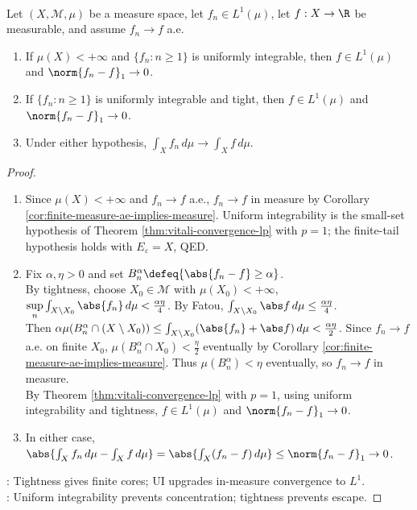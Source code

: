 \begin{theorem} \label{thm:vitali-convergence-l1-ui-tight-ae} \\
Let $(X,\mathcal{M},\mu)$ be a measure space, let $f_n\in L^1(\mu)$, let $f:X\to\R$ be measurable, and assume $f_n\to f$ a.e.
\begin{enumerate}[label=(\roman*)]
\setlength{\itemsep}{0pt}
\item If $\mu(X)<+\infty$ and $\{f_n:n\geq1\}$ is uniformly integrable, then $f\in L^1(\mu)$ and $\norm{f_n-f}_1\to0$.
\item If $\{f_n:n\geq1\}$ is uniformly integrable and tight, then $f\in L^1(\mu)$ and $\norm{f_n-f}_1\to0$.
\item Under either hypothesis, $\int_Xf_n\,d\mu\to\int_Xf\,d\mu$.
\end{enumerate}
\begin{proof}
\begin{enumerate}[label=(\roman*)]
\setlength{\itemsep}{0pt}
\item Since $\mu(X)<+\infty$ and $f_n\to f$ a.e., $f_n\to f$ in measure by Corollary \ref{cor:finite-measure-ae-implies-measure}. Uniform integrability is the small-set hypothesis of Theorem \ref{thm:vitali-convergence-lp} with $p=1$; the finite-tail hypothesis holds with $E_\varepsilon=X$, QED.
\item Fix $\alpha,\eta>0$ and set $B_n^\alpha\defeq\{\abs{f_n-f}\geq\alpha\}$.\\
By tightness, choose $X_0\in\mathcal M$ with $\mu(X_0)<+\infty$, $\sup\limits_n\int_{X\setminus X_0}\abs{f_n}\,d\mu<\frac{\alpha\eta}{4}$. By Fatou, $\int_{X\setminus X_0}\abs f\,d\mu\leq\frac{\alpha\eta}{4}$.\\
Then $\alpha\mu(B_n^\alpha\cap(X\setminus X_0))\leq\int_{X\setminus X_0}(\abs{f_n}+\abs f)\,d\mu<\frac{\alpha\eta}{2}$. Since $f_n\to f$ a.e. on finite $X_0$, $\mu(B_n^\alpha\cap X_0)<\frac{\eta}{2}$ eventually by Corollary \ref{cor:finite-measure-ae-implies-measure}. Thus $\mu(B_n^\alpha)<\eta$ eventually, so $f_n\to f$ in measure.\\
By Theorem \ref{thm:vitali-convergence-lp} with $p=1$, using uniform integrability and tightness, $f\in L^1(\mu)$ and $\norm{f_n-f}_1\to0$.
\item In either case, $\abs{\int_Xf_n\,d\mu-\int_Xf\,d\mu}=\abs{\int_X(f_n-f)\,d\mu}\leq\norm{f_n-f}_1\to0$.
\end{enumerate}
: Tightness gives finite cores; UI upgrades in-measure convergence to $L^1$.\\
: Uniform integrability prevents concentration; tightness prevents escape.
\end{proof}
\end{theorem}

